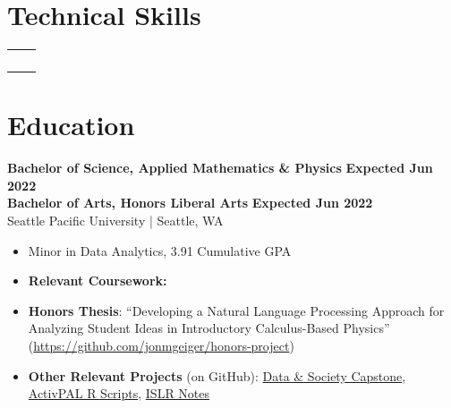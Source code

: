 \documentclass{article}
\begin{document}
\maketitle




\section{Technical Skills}
    \begin{flushleft}
        \begin{tabular}{>{\raggedleft\arraybackslash}p{1.25in} >{\raggedright\arraybackslash}p{5.85in}}
             \\
             \\
             \\
             \\
             \\
        \end{tabular}
    \end{flushleft}




\section{Education}

    \textbf{Bachelor of Science, Applied Mathematics \& Physics} \hfill \textbf{Expected Jun 2022}\\
    \textbf{Bachelor of Arts, Honors Liberal Arts} \hfill \textbf{Expected Jun 2022}\\
    Seattle Pacific University | Seattle, WA 
    \squish
    \begin{itemize} %
        \item Minor in Data Analytics, 3.91 Cumulative GPA
        \item 
        \textbf{Relevant Coursework:} 
        \item 
        \textbf{Honors Thesis}: ``Developing a Natural Language Processing Approach for Analyzing Student Ideas in Introductory Calculus-Based Physics'' (\url{https://github.com/jonmgeiger/honors-project})
        \item \textbf{Other Relevant Projects} (on GitHub): \href{https://github.com/jonmgeiger/household-conditions}{Data \& Society Capstone}, \href{https://github.com/jonmgeiger/activPAL}{ActivPAL R Scripts}, \href{https://github.com/jonmgeiger/islr-notes}{ISLR Notes}
    \end{itemize}
\end{document}
